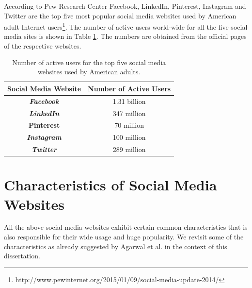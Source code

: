 According to Pew Research Center Facebook, LinkedIn, Pinterest, Instagram and Twitter are the top five most popular social media websites used by American adult Internet users\footnote{http://www.pewinternet.org/2015/01/09/social-media-update-2014/}. The number of active users world-wide for all the five social media sites is shown in Table \ref{socialmediastat}. The numbers are obtained from the official pages of the respective websites. 

\begin{table}[h]
\centering
\caption{Number of active users for the top five social media websites used by American adults.}
\label{socialmediastat}
\begin{tabular}{|c|c|}
\hline
\textbf{Social Media Website} & \textbf{Number of Active Users} \\ \hline
\textbf{\textit{Facebook}} & 1.31 billion \\ \hline
\textbf{\textit{LinkedIn}} &  347 million \\ \hline
\textbf{Pinterest} & 70 million \\ \hline
\textbf{\textit{Instagram}} & 100 million \\ \hline
\textbf{\textit{Twitter}} & 289 million \\ \hline
\end{tabular}
\end{table}

\section{Characteristics of Social Media Websites\label{char}}
All the above social media websites exhibit certain common characteristics that is also responsible for their wide usage and huge popularity. We revisit some of the characteristics as already suggested by Agarwal et al. \cite{agarwal2010information} in the context of this dissertation.

